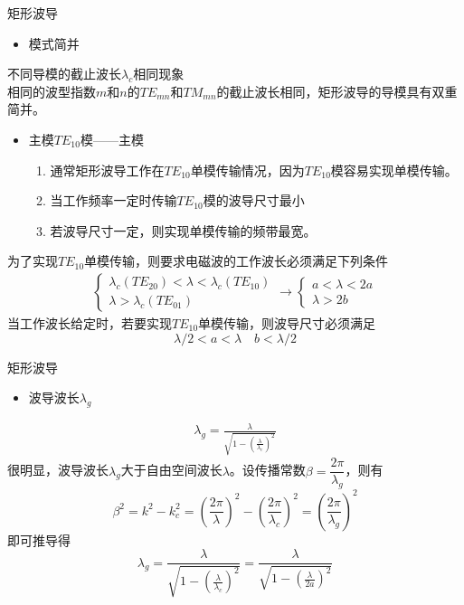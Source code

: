 \begin{frame}{矩形波导}
    \begin{itemize}
        \item 模式简并
    \end{itemize}
    不同导模的截止波长$\lambda_c$相同现象\\
    相同的波型指数$m$和$n$的$TE_{mn}$和$TM_{mn}$的截止波长相同，矩形波导的导模具有双重简并。
    \begin{itemize}
        \item 主模$TE_{10}$模——主模
        \begin{enumerate}
            \item 通常矩形波导工作在$TE_{10}$单模传输情况，因为$TE_{10}$模容易实现单模传输。
            \item 当工作频率一定时传输$TE_{10}$模的波导尺寸最小
            \item 若波导尺寸一定，则实现单模传输的频带最宽。
        \end{enumerate}
    \end{itemize}
    为了实现$TE_{10}$单模传输，则要求电磁波的工作波长必须满足下列条件
    \begin{align*}
        \begin{cases}
            \lambda_c(TE_{20})<\lambda<\lambda_c(TE_{10})\\
            \lambda>\lambda_c(TE_{01})
        \end{cases}
        \rightarrow
        \begin{cases}
            a<\lambda<2a\\
            \lambda>2b
        \end{cases}
    \end{align*}
    当工作波长给定时，若要实现$TE_{10}$单模传输，则波导尺寸必须满足
    $$\lambda/2<a<\lambda \quad b<\lambda/2$$
\end{frame}

\begin{frame}{矩形波导}
    \begin{itemize}
        \item 波导波长$\lambda_g$
    \end{itemize}
    \begin{align}
        \lambda_g=\frac{\lambda}{\sqrt{1-\left(\frac{\lambda}{\lambda_c}\right)^2}}
    \end{align}
    很明显，波导波长$\lambda_g$大于自由空间波长$\lambda$。设传播常数$\beta=\dfrac{2\pi}{\lambda_g}$，则有
    $$\beta^2=k^2-k_c^2=\left(\frac{2\pi}{\lambda}\right)^2-\left(\frac{2\pi}{\lambda_c}\right)^2=\left(\frac{2\pi}{\lambda_g}\right)^2$$
    即可推导得
    $$\lambda_g=\frac{\lambda}{\sqrt{1-\left(\frac{\lambda}{\lambda_c}\right)^2}}=\frac{\lambda}{\sqrt{1-\left(\frac{\lambda}{2a}\right)^2}}$$
\end{frame}

